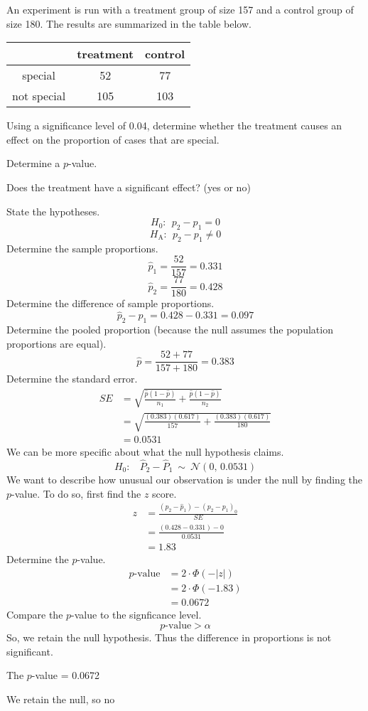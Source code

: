 
\begin{question}
An experiment is run with a treatment group of size 157 and a control
group of size 180. The results are summarized in the table below.

\begin{longtable}[]{@{}ccc@{}}
\toprule
& treatment & control\tabularnewline
\midrule
\endhead
special & 52 & 77\tabularnewline
not special & 105 & 103\tabularnewline
\bottomrule
\end{longtable}

Using a significance level of 0.04, determine whether the treatment
causes an effect on the proportion of cases that are special.
\begin{answerlist}
  \item Determine a \(p\)-value.
  \item Does the treatment have a significant effect? (yes or no)
\end{answerlist}
\end{question}

\begin{solution}
State the hypotheses. \[H_0:~~ p_2-p_1 = 0 \]
\[H_\text{A}: ~~ p_2-p_1 \ne 0 \] Determine the sample proportions.
\[\hat{p}_1 = \frac{52}{157} = 0.331 \]
\[\hat{p}_2 = \frac{77}{180} = 0.428 \] Determine the difference of
sample proportions. \[\hat{p}_2-\hat{p}_1 = 0.428-0.331 = 0.097 \]
Determine the pooled proportion (because the null assumes the population
proportions are equal). \[ \hat{p} = \frac{52+77}{157+180} = 0.383 \]
Determine the standard error. \[
\begin{aligned}
SE &= \sqrt{\frac{\hat{p}(1-\hat{p})}{n_1}+\frac{\hat{p}(1-\hat{p})}{n_2}} \\[1em]
&= \sqrt{\frac{(0.383)(0.617)}{157}+\frac{(0.383)(0.617)}{180}} \\[1em]
&= 0.0531
\end{aligned}
\] We can be more specific about what the null hypothesis claims.
\[H_0:~~~~ \hat{P}_2-\hat{P}_1 ~\sim~ \mathcal{N}(0,\,0.0531)\] We want
to describe how unusual our observation is under the null by finding the
\(p\)-value. To do so, first find the \(z\) score. \[
\begin{aligned}
z &= \frac{(\hat{p}_2-\hat{p}_1)-(p_2-p_1)_0}{SE}\\
&= \frac{(0.428-0.331)-0}{0.0531} \\
&= 1.83
\end{aligned}
\] Determine the \(p\)-value. \[
\begin{aligned}
p\text{-value} &= 2\cdot \Phi(-|z|)\\
&= 2\cdot \Phi(-1.83)\\
&= 0.0672
\end{aligned}
\] Compare the \(p\)-value to the signficance level.
\[ p\text{-value} > \alpha \] So, we retain the null hypothesis. Thus
the difference in proportions is not significant.
\begin{answerlist}
  \item The \(p\)-value = 0.0672
  \item We retain the null, so no
\end{answerlist}
\end{solution}

